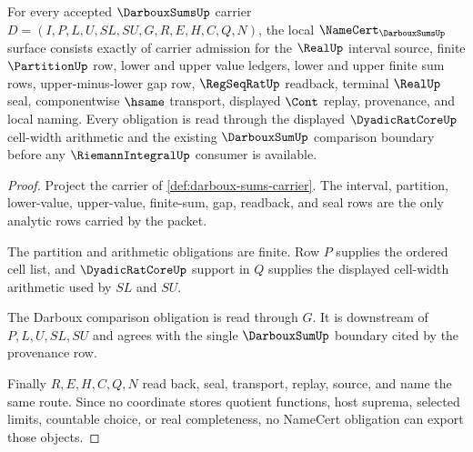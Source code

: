\begin{theorem}
\label{thm:darboux-sums-namecert-obligations}
For every accepted $\DarbouxSumsUp$ carrier $D=(I,P,L,U,SL,SU,G,R,E,H,C,Q,N)$, the local $\NameCert_{\DarbouxSumsUp}$ surface consists exactly of carrier admission for the $\RealUp$ interval source, finite $\PartitionUp$ row, lower and upper value ledgers, lower and upper finite sum rows, upper-minus-lower gap row, $\RegSeqRatUp$ readback, terminal $\RealUp$ seal, componentwise $\hsame$ transport, displayed $\Cont$ replay, provenance, and local naming. Every obligation is read through the displayed $\DyadicRatCoreUp$ cell-width arithmetic and the existing $\DarbouxSumUp$ comparison boundary before any $\RiemannIntegralUp$ consumer is available.
\end{theorem}
\begin{proof}
Project the carrier of \autoref{def:darboux-sums-carrier}. The interval, partition, lower-value, upper-value, finite-sum, gap, readback, and seal rows are the only analytic rows carried by the packet.

The partition and arithmetic obligations are finite. Row $P$ supplies the ordered cell list, and $\DyadicRatCoreUp$ support in $Q$ supplies the displayed cell-width arithmetic used by $SL$ and $SU$.

The Darboux comparison obligation is read through $G$. It is downstream of $P,L,U,SL,SU$ and agrees with the single $\DarbouxSumUp$ boundary cited by the provenance row.

Finally $R,E,H,C,Q,N$ read back, seal, transport, replay, source, and name the same route. Since no coordinate stores quotient functions, host suprema, selected limits, countable choice, or real completeness, no NameCert obligation can export those objects.
\end{proof}

